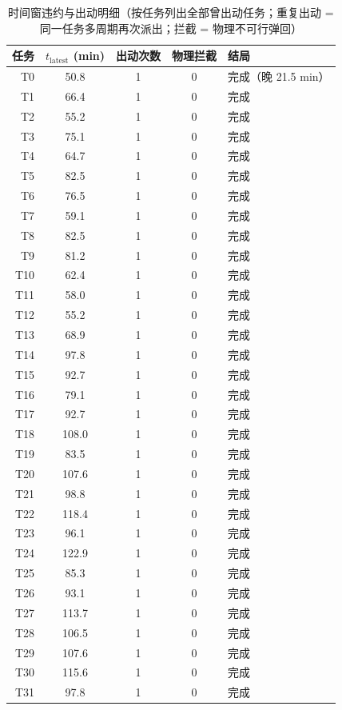 \documentclass[a4paper,11pt]{article}
\begin{document}
\begin{table}[htbp]\centering
\caption{时间窗违约与出动明细（按任务列出全部曾出动任务；重复出动 = 同一任务多周期再次派出；拦截 = 物理不可行弹回）}
\label{tab:exp01-tw}
\begin{tabular}{rcccl}
\toprule
任务 & $t_{\mathrm{latest}}$ (min) & 出动次数 & 物理拦截 & 结局 \\
\midrule
T0 & 50.8 & 1 & 0 & 完成（晚 21.5 min） \\
T1 & 66.4 & 1 & 0 & 完成 \\
T2 & 55.2 & 1 & 0 & 完成 \\
T3 & 75.1 & 1 & 0 & 完成 \\
T4 & 64.7 & 1 & 0 & 完成 \\
T5 & 82.5 & 1 & 0 & 完成 \\
T6 & 76.5 & 1 & 0 & 完成 \\
T7 & 59.1 & 1 & 0 & 完成 \\
T8 & 82.5 & 1 & 0 & 完成 \\
T9 & 81.2 & 1 & 0 & 完成 \\
T10 & 62.4 & 1 & 0 & 完成 \\
T11 & 58.0 & 1 & 0 & 完成 \\
T12 & 55.2 & 1 & 0 & 完成 \\
T13 & 68.9 & 1 & 0 & 完成 \\
T14 & 97.8 & 1 & 0 & 完成 \\
T15 & 92.7 & 1 & 0 & 完成 \\
T16 & 79.1 & 1 & 0 & 完成 \\
T17 & 92.7 & 1 & 0 & 完成 \\
T18 & 108.0 & 1 & 0 & 完成 \\
T19 & 83.5 & 1 & 0 & 完成 \\
T20 & 107.6 & 1 & 0 & 完成 \\
T21 & 98.8 & 1 & 0 & 完成 \\
T22 & 118.4 & 1 & 0 & 完成 \\
T23 & 96.1 & 1 & 0 & 完成 \\
T24 & 122.9 & 1 & 0 & 完成 \\
T25 & 85.3 & 1 & 0 & 完成 \\
T26 & 93.1 & 1 & 0 & 完成 \\
T27 & 113.7 & 1 & 0 & 完成 \\
T28 & 106.5 & 1 & 0 & 完成 \\
T29 & 107.6 & 1 & 0 & 完成 \\
T30 & 115.6 & 1 & 0 & 完成 \\
T31 & 97.8 & 1 & 0 & 完成 \\

\end{tabular}
\end{table}
\end{document}
